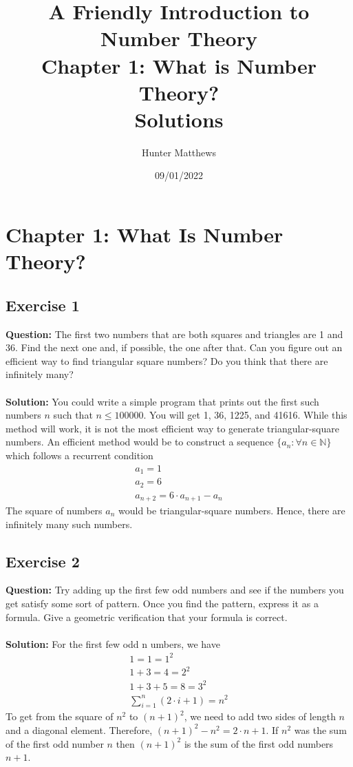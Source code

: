 \documentclass{article}
\title{%
  A Friendly Introduction to Number Theory \\
  \large Chapter 1: What is Number Theory? \\
    Solutions}
\author{Hunter Matthews}
\date{09/01/2022}
\begin{document}
\maketitle
\newpage
\tableofcontents
\newpage
\section{Chapter 1: What Is Number Theory?}
\subsection{Exercise 1}
\textbf{Question:} The first two numbers that are both squares and triangles are 1 and 36. Find the next one
and, if possible, the one after that. Can you figure out an efficient way to find triangular square numbers? Do you think that there are infinitely many?\\
\\\textbf{Solution:} You could write a simple program that prints out the first such numbers $n$ such that $n\leq 100000$. You will get 1, 36, 1225, and 41616. While this method will work, it is not the most efficient way to generate triangular-square numbers. An efficient method would be to construct a sequence $\{a_n:\forall n\in\mathbb{N}\}$ which follows a recurrent condition
\begin{equation*}
\begin{split}
a_1 = 1
\\a_2 = 6
\\a_{n+2}=6\cdot a_{n+1}-a_n
\end{split}
\end{equation*}
The square of numbers $a_n$ would be triangular-square numbers. Hence, there are infinitely many such numbers.
\newpage
\subsection{Exercise 2}
\textbf{Question:} Try adding up the first few odd numbers and see if the numbers you get satisfy some sort of pattern. Once you find the pattern, express it as a formula. Give a geometric verification that your formula is correct.\\
\\\textbf{Solution:} For the first few odd n umbers, we have
\begin{equation*}
\begin{split}
1 = 1 = 1^2
\\1 + 3 = 4 = 2^2
\\1 + 3 + 5 = 8 = 3^2
\\\sum_{i = 1}^n (2\cdot i + 1) = n^2
\end{split}
\end{equation*}
To get from the square of $n^2$ to $(n+1)^2$, we need to add two sides of length $n$ and a diagonal element. Therefore, $(n+1)^2-n^2=2\cdot n+1$. If $n^2$ was the sum of the first odd number $n$ then $(n+1)^2$ is the sum of the first odd numbers $n+1$.
\newpage
\end{document}
